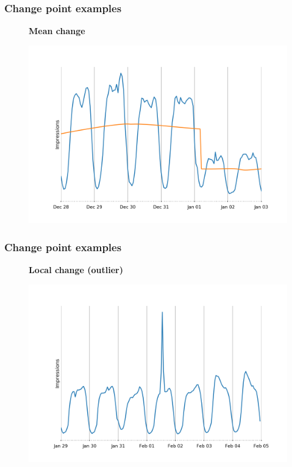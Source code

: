\documentclass[intlimits, 9pt, unicode]{beamer}
\begin{document}
\begin{frame}
\frametitle{Change point examples}
\begin{figure}
\textbf{Mean change}\par\medskip
\includegraphics[scale=0.30]{images/1_examples_mean}
\end{figure}
\end{frame}


\begin{frame}
\frametitle{Change point examples}
\begin{figure}
\textbf{Local change (outlier)}\par\medskip
\includegraphics[scale=0.30]{images/005_point}
\end{figure}
\end{frame}
\end{document}
